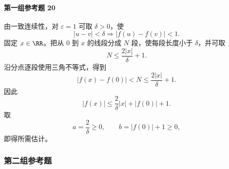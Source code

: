 \paragraph{第一组参考题 20}
\begin{xsolution}
由一致连续性，对 $\varepsilon=1$ 可取 $\delta>0$，使
\[
 |u-v|<\delta
 \Longrightarrow
 |f(u)-f(v)|<1.
\]
固定 $x\in\RR$。把从 $0$ 到 $x$ 的线段分成 $N$ 段，使每段长度小于 $\delta$，并可取
\[
 N\le\frac{2|x|}{\delta}+1.
\]
沿分点逐段使用三角不等式，得到
\[
 |f(x)-f(0)|<N
 \le\frac{2|x|}{\delta}+1.
\]
因此
\[
 |f(x)|
 \le \frac{2}{\delta}|x|+|f(0)|+1.
\]
取
\[
 a=\frac2\delta\ge0,
 \qquad b=|f(0)|+1\ge0,
\]
即得所需估计。
\end{xsolution}


\subsubsection*{第二组参考题}

